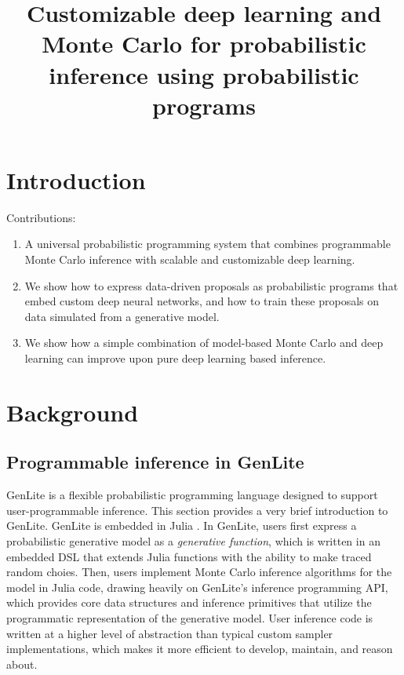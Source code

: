 \documentclass{article}
\title{Customizable deep learning and Monte Carlo for probabilistic inference using probabilistic programs}
\begin{document}
\maketitle

\begin{abstract}

\end{abstract}

\section{Introduction}

Contributions:
\begin{enumerate}
\item A universal probabilistic programming system that combines programmable Monte Carlo inference with scalable and customizable deep learning.
\item We show how to express data-driven proposals as probabilistic programs that embed custom deep neural networks, and how to train these proposals on data simulated from a generative model.
\item We show how a simple combination of model-based Monte Carlo and deep learning can improve upon pure deep learning based inference.
\end{enumerate}

\section{Background}

\subsection{Programmable inference in GenLite}
GenLite \cite{TODO} is a flexible probabilistic programming language designed to support user-programmable inference.
This section provides a very brief introduction to GenLite.
GenLite is embedded in Julia \cite{TODO}.
In GenLite, users first express a probabilistic generative model as a \emph{generative function}, which is written in an embedded DSL that extends Julia functions with the ability to make traced random choies.
Then, users implement Monte Carlo inference algorithms for the model in Julia code, drawing heavily on GenLite's inference programming API, which provides core data structures and inference primitives that utilize the programmatic representation of the generative model.
User inference code is written at a higher level of abstraction than typical custom sampler implementations, which makes it more efficient to develop, maintain, and reason about.
\end{document}
